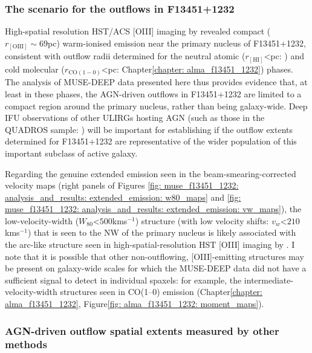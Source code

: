 \subsubsection{The scenario for the outflows in F13451+1232}
\label{section: muse_f13451_1232: discussion: comparison_to_observational_studies: f13451_1232}

High-spatial resolution HST/ACS [OIII] imaging by \citet{Tadhunter2018} revealed compact ($r_\mathrm{[OIII]}\sim69$\;pc) warm-ionised emission near the primary nucleus of F13451+1232, consistent with outflow radii determined for the neutral atomic ($r_\mathrm{[HI]}$\;\textless{}\;pc: \citealt{Morganti2013_4c1250}) and cold molecular ($r_\mathrm{CO(1-0)}$\;\textless{}\;pc: Chapter\;\ref{chapter: alma_f13451_1232}) phases. The analysis of MUSE-DEEP data presented here thus provides evidence that, at least in these phases, the AGN-driven outflows in F13451+1232 are limited to a compact region around the primary nucleus, rather than being galaxy-wide. Deep IFU observations of other ULIRGs hosting AGN (such as those in the QUADROS sample: \citealt{Rose2018, Tadhunter2018, Spence2018, Tadhunter2019}) will be important for establishing if the outflow extents determined for F13451+1232 are representative of the wider population of this important subclass of active galaxy.

Regarding the genuine extended emission seen in the beam-smearing-corrected velocity maps (right panels of Figures \ref{fig: muse_f13451_1232: analysis_and_results: extended_emission: w80_maps} and \ref{fig: muse_f13451_1232: analysis_and_results: extended_emission: vw_maps}), the low-velocity-width ($W_\mathrm{80}$\;\textless\;$500$\;km\;s$^{-1}$) structure (with low velocity shifts: $v_w$\;\textless\;$210$\;km\;s$^{-1}$) that is seen to the NW of the primary nucleus is likely associated with the arc-like structure seen in high-spatial-resolution HST [OIII] imaging by \citet{Tadhunter2018}. I note that it is possible that other non-outflowing, [OIII]-emitting structures may be present on galaxy-wide scales for which the MUSE-DEEP data did not have a sufficient signal to detect in individual spaxels: for example, the intermediate-velocity-width structures seen in CO(1--0) emission (Chapter\;\ref{chapter: alma_f13451_1232}, Figure\;\ref{fig: alma_f13451_1232: moment_maps}).

\subsubsection{AGN-driven outflow spatial extents measured by other methods}
\label{section: muse_f13451_1232: discussion: comparison_to_observational_studies: other_methods}

